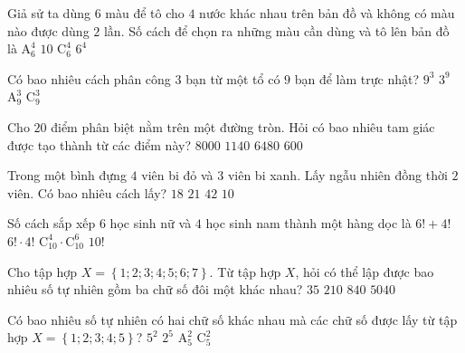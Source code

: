 \begin{ex}%
	Giả sử ta dùng $6$ màu để tô cho $4$ nước khác nhau trên bản đồ và không có màu nào được dùng $2$ lần. Số cách để chọn ra những màu cần dùng và tô lên bản đồ là
	\choice
	{\True $\mathrm{A}^4_6$}
	{$10$}
	{$\mathrm{C}^4_6$}
	{$6^4$}
\end{ex}
\begin{ex}%
	Có bao nhiêu cách phân công $3$ bạn từ một tổ có $9$ bạn để làm trực nhật?
	\choice
	{$9^3$}
	{$3^9$}
	{$\mathrm{A}^3_9$}
	{\True $\mathrm{C}^3_9$}
\end{ex}
\begin{ex}%
	Cho $20$ điểm phân biệt nằm trên một đường tròn. Hỏi có bao nhiêu tam giác được tạo thành từ các điểm này?
	\choice
	{$8000$}
	{\True $1140$}
	{$6480$}
	{$600$}
\end{ex}
\begin{ex}%
	Trong một bình đựng $4$ viên bi đỏ và $3$ viên bi xanh. Lấy ngẫu nhiên đồng thời $2$ viên. Có bao nhiêu cách lấy?
	\choice
	{$18$}
	{\True $21$}
	{$42$}
	{$10$}
\end{ex}
\begin{ex}%
	Số cách sắp xếp $6$ học sinh nữ và $4$ học sinh nam thành một hàng dọc là
	\choice
	{$6!+4!$}
	{$6!\cdot 4!$}
	{$\mathrm{C}^4_{10}\cdot \mathrm{C}^6_{10}$}
	{\True $10!$}
\end{ex}
\begin{ex}%
	Cho tập hợp $X=\left\{1;2;3;4;5;6;7\right\}$. Từ tập hợp $X$, hỏi có thể lập được bao nhiêu số tự nhiên gồm ba chữ số đôi một khác nhau?
	\choice
	{$35$}
	{\True $210$}
	{$840$}
	{$5040$}
\end{ex}
\begin{ex}%
	Có bao nhiêu số tự nhiên có hai chữ số khác nhau mà các chữ số được lấy từ tập hợp $X=\left\{1;2;3;4;5\right\}$?
	\choice
	{$5^2$}
	{$2^5$}
	{\True $\mathrm{A}^2_5$}
	{$\mathrm{C}^2_5$}
\end{ex}
